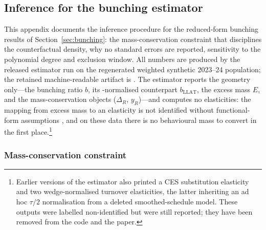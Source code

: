 \subsection{Inference for the bunching estimator}
\label{app:inference}

This appendix documents the inference procedure for the reduced-form bunching
results of Section~\ref{sec:bunching}: the mass-conservation constraint that
disciplines the counterfactual density, why no standard errors are reported,
sensitivity to the polynomial degree and exclusion window. All numbers are
produced by the released estimator run on the regenerated weighted synthetic
2023--24 population; the retained machine-readable artifact is
. The estimator reports the geometry
only---the bunching ratio $b$, its \citet{liuetal2021}-normalised counterpart
$b_{\mathrm{LLAT}}$, the excess mass $E$, and the mass-conservation objects
($\Delta_R$, $y_R$)---and computes no elasticities: the mapping from excess
mass to an elasticity is not identified without functional-form assumptions
\citep{blomquistetal2021,bertanhaetal2023}, and on these data there is no
behavioural mass to convert in the first place.\footnote{Earlier versions of
the estimator also printed a CES substitution elasticity and two
wedge-normalised turnover elasticities, the latter inheriting an ad hoc
$\tau/2$ normalisation from a deleted smoothed-schedule model. These outputs
were labelled non-identified but were still reported; they have been removed
from the code and the paper.}

\subsubsection*{Mass-conservation constraint}


